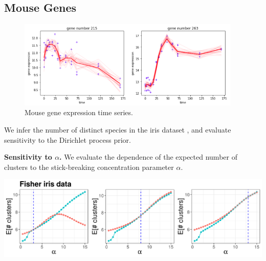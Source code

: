 \documentclass[a0,plainsections,30pt]{sciposter}\usepackage[]{graphicx}\usepackage[]{color}
\newenvironment{knitrout}{}{} %
\begin{document}
\begin{minipage}[t]{0.45\textwidth}
\begin{minipage}[t]{0.49\textwidth}
    \subsection*{Mouse Genes}
    \begin{figure}[!h]
    \centering
    \includegraphics[width = 0.95\textwidth]{./static_images/mouse_genes.png}
    \caption{Mouse gene expression time series.}
    \setlength{\textfloatsep}{-10pt}
    \end{figure}
\end{minipage}
We infer the number of distinct species in the iris
dataset \cite{iris_data_anderson}, and evaluate sensitivity to the Dirichlet process prior.
\vspace{0.1in}

{\bf \large Sensitivity to $\alpha$.}
We evaluate the dependence of the expected number of clusters to the stick-breaking concentration parameter $\alpha$.

\vspace{0.05in}
%

\begin{knitrout}
\color{fgcolor}

{\centering \includegraphics[width=0.98\linewidth,height=0.294\linewidth]{figure/param_sens_plot-1} 

}



\end{knitrout}

\begin{knitrout}
\color{fgcolor}


\end{knitrout}
\end{minipage}
\end{document}
